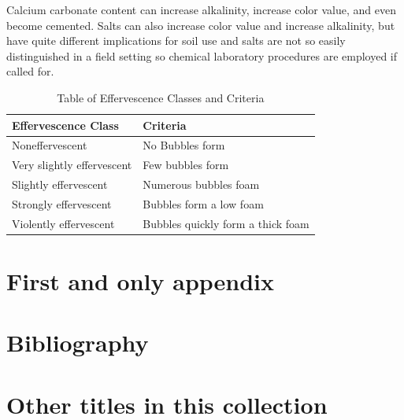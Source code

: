 \documentclass{book}
\begin{document}
Calcium carbonate content can increase alkalinity, increase color value, and even become cemented. Salts can also increase color value and increase alkalinity, but have quite different implications for soil use and salts are not so easily distinguished in a field setting so chemical laboratory procedures are employed if called for.

\begin{table}[!htbp]
\centering
\caption{Table of Effervescence Classes and Criteria}
\label{tab:effervescenceclasses}
\begin{tabular}{ll}
\hline
Effervescence Class         & Criteria                          \\
\hline \hline
Noneffervescent             & No Bubbles form                   \\
Very slightly effervescent  & Few bubbles form                  \\
Slightly effervescent       & Numerous bubbles foam             \\
Strongly effervescent       & Bubbles form a low foam           \\
Violently effervescent      & Bubbles quickly form a thick foam \\
\hline
\end{tabular}
\end{table}





\appendix
\chapter{First and only appendix}
\backmatter
\chapter{Bibliography}


\chapter{Other titles in this collection}
\end{document}
